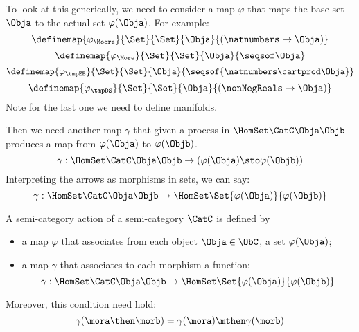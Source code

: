 To look at this generically, we need to consider a map $\varphi$ that maps the base set $\Obja$ to the actual set $\varphi(\Obja)$. For example:
\begin{equation}
  \definemap{\varphi_{\Moore}}{\Set}{\Set}{\Obja}{(\natnumbers \to \Obja)}
\end{equation}
\begin{equation}
\definemap{\varphi_{\More}}{\Set}{\Set}{\Obja}{\seqsof \Obja}
\end{equation}
\begin{equation}
\definemap{\varphi_{\tmpEB}}{\Set}{\Set}{\Obja}{\seqsof{\natnumbers \cartprod \Obja}}
\end{equation}
\begin{equation}
\definemap{\varphi_{\tmpDS}}{\Set}{\Set}{\Obja}{(\nonNegReals \to \Obja)}
\end{equation}
Note for the last one we need to define manifolds.


Then we need another map $\gamma$ that given a process in $\HomSet\CatC\Obja\Objb$ 
produces a map from $\varphi(\Obja)$ to $\varphi(\Objb)$.
% 
\begin{equation}
  \gamma: \HomSet\CatC\Obja\Objb \to  (\varphi(\Obja) \sto \varphi(\Objb))
\end{equation}
% 
Interpreting the arrows as morphisms in sets, we can say:
\begin{equation}
  \gamma: \HomSet\CatC\Obja\Objb \to  \HomSet\Set{\varphi(\Obja)}{\varphi(\Objb) }
\end{equation}

\begin{ctdefinition}
  A semi-category action of a semi-category $\CatC$ is defined by 
  \begin{itemize}
    \item a map $\varphi$ that associates from each object $\Obja \in \ObC$, a set $\varphi(\Obja)$;
    \item a map $\gamma$ that associates to each morphism a function:
    \begin{equation}
      \gamma: \HomSet\CatC\Obja\Objb \to  \HomSet\Set{\varphi(\Obja)}{\varphi(\Objb) }
    \end{equation}
  \end{itemize}
  Moreover, this condition need hold:
  \begin{equation}
    \gamma(\mora\then\morb) = \gamma(\mora) \mthen \gamma(\morb)
  \end{equation}
\end{ctdefinition}

